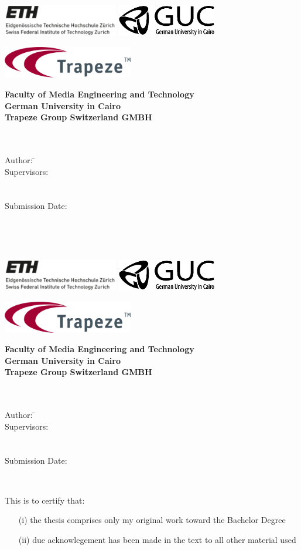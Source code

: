 \newcommand{\titlePage}{

\thispagestyle{empty}
\begin{center}
	\includegraphics[height=1.4cm]{images/eth.png} \hfill \includegraphics[height=1.4cm]{images/gucblack.png}\\[1mm]
	\begin{center}
		\includegraphics[height=1.4cm]{images/trapeze_logo.png}\\[10mm]
	\end{center}
	\textbf{Faculty of Media Engineering and Technology}\\[1mm]
	\textbf{German University in Cairo}\\[1mm]
	\textbf{Trapeze Group Switzerland GMBH}\\[1mm]
	
	
	
	\vspace{2cm}
	\doublespacing
	{\Huge \textbf{\titleOfThesisOne}}\\
	\singlespacing
	\vspace{2cm}
	{\large \textbf{\typeOfThesis}}\\
	
	\vfill
	\parbox{1cm}{
  		\begin{large}
    			\begin{tabbing}
       			Author: \hspace{2cm}  
        			\=\authorOfThesis\\[2mm]
      			Supervisors: 
        			\>\supervisorOne\\[2mm]
				\>\supervisorTwo\\[2mm]
				\>\supervisorThree\\[2mm]
      			Submission Date: 
        			\>\submissionDate\\
    			\end{tabbing}
  		\end{large}
	}\\
\end{center}
\clearpage
}
\titlePage
\thispagestyle{empty}\ \clearpage
\titlePage
\thispagestyle{empty}
This is to certify that:
\begin{itemize}
\item[(i)] the thesis comprises only my original work toward the Bachelor Degree
\item[(ii)] due acknowlegement has been made in the text to all other material used
\end{itemize}

